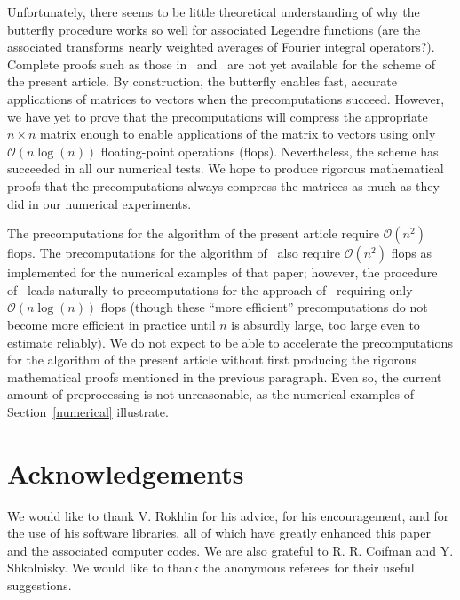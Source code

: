 \documentclass[final,3p,times]{elsarticle}
\def\bigoh{\mathcal{O}}
\begin{document}
Unfortunately, there seems to be little theoretical understanding
of why the butterfly procedure works so well for associated Legendre functions
(are the associated transforms nearly weighted averages
of Fourier integral operators?).
Complete proofs such as those in~\cite{oneil-woolfe-rokhlin}
and~\cite{tygert_sph} are not yet available for the scheme
of the present article.
By construction, the butterfly enables fast, accurate
applications of matrices to vectors when the precomputations succeed.
However, we have yet to prove that the precomputations
will compress the appropriate $n \times n$ matrix
enough to enable applications of the matrix to vectors
using only $\bigoh(n \log(n))$ floating-point operations (flops).
Nevertheless, the scheme has succeeded in all our numerical tests.
We hope to produce rigorous mathematical proofs that the precomputations
always compress the matrices as much as they did in our numerical experiments.

The precomputations for the algorithm of the present article
require $\bigoh(n^2)$ flops.
The precomputations for the algorithm of~\cite{tygert_sph} also
require $\bigoh(n^2)$ flops as implemented for the numerical examples
of that paper; however, the procedure of~\cite{gu-eisenstat95}
leads naturally to precomputations for the approach of~\cite{tygert_sph}
requiring only $\bigoh(n \log(n))$ flops
(though these ``more efficient'' precomputations do not become more efficient
in practice until $n$ is absurdly large, too large even to estimate reliably).
We do not expect to be able to accelerate the precomputations
for the algorithm of the present article without first producing
the rigorous mathematical proofs mentioned in the previous paragraph.
Even so, the current amount of preprocessing is not unreasonable,
as the numerical examples of Section~\ref{numerical} illustrate.



\section*{Acknowledgements}

We would like to thank V. Rokhlin for his advice, for his encouragement,
and for the use of his software libraries,
all of which have greatly enhanced this paper
and the associated computer codes.
We are also grateful to R. R. Coifman and Y. Shkolnisky.
We would like to thank the anonymous referees for their useful suggestions.
\end{document}
